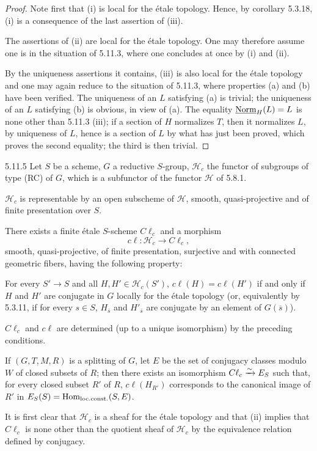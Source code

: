 \begin{proof}
Note first that (i) is local for the \'etale topology. Hence, by corollary 5.3.18, (i) is a consequence of the last assertion of (iii).

The assertions of (ii) are local for the \'etale topology. One may therefore assume one is in the situation of 5.11.3, where one concludes at once by (i) and (ii).

By the uniqueness assertions it contains, (iii) is also local for the \'etale topology and one may again reduce to the situation of 5.11.3, where properties (a) and (b) have been verified. The uniqueness of an $L$ satisfying (a) is trivial; the uniqueness of an $L$ satisfying (b) is obvious, in view of (a). The equality $\underline{\mathrm{Norm}}_H(L)=L$ is none other than 5.11.3 (iii); if a section of $H$ normalizes $T$, then it normalizes $L$, by uniqueness of $L$, hence is a section of $L$ by what has just been proved, which proves the second equality; the third is then trivial.
\end{proof}
\begin{proposition}{5.11.5}\label{XXII.5.11.5}
Let $S$ be a scheme, $G$ a reductive $S$-group, $\mathscr H_c$ the functor of subgroups of type (RC) of $G$, which is a subfunctor of the functor $\mathscr H$ of 5.8.1.
\begin{enumeratei}
\item $\mathscr H_c$ is representable by an open subscheme of $\mathscr H$, smooth, quasi-projective and of finite presentation over $S$.
\item There exists a finite \'etale $S$-scheme $C\ell_c$ and a morphism
\[
c\ell:\mathscr H_c\to C\ell_c,
\]
smooth, quasi-projective, of finite presentation, surjective and with connected geometric fibers, having the following property:

For every $S'\to S$ and all $H,H'\in\mathscr H_c(S')$, $c\ell(H)=c\ell(H')$ if and only if $H$ and $H'$ are conjugate in $G$ locally for the \'etale topology (or, equivalently by 5.3.11, if for every $s\in S$, $H_{\overline s}$ and $H'_{\overline s}$ are conjugate by an element of $G(\overline s)$).
\item $C\ell_c$ and $c\ell$ are determined (up to a unique isomorphism) by the preceding conditions.
\item If $(G,T,M,R)$ is a splitting of $G$, let $E$ be the set of conjugacy classes modulo $W$ of closed subsets of $R$; then there exists an isomorphism $C\ell_c\xrightarrow{\sim} E_S$ such that, for every closed subset $R'$ of $R$, $c\ell(H_{R'})$ corresponds to the canonical image of $R'$ in $E_S(S)=\operatorname{Hom}_{\mathrm{loc.const.}}(S,E)$.
\end{enumeratei}
\end{proposition}
It is first clear that $\mathscr H_c$ is a sheaf for the \'etale topology and that (ii) implies that $C\ell_c$ is none other than the quotient sheaf of $\mathscr H_c$ by the equivalence relation defined by conjugacy.

